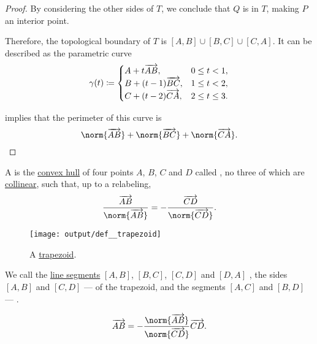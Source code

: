 \begin{proof}
  By considering the other sides of \( T \), we conclude that \( Q \) is in \( T \), making \( P \) an interior point.

  Therefore, the topological boundary of \( T \) is \( [A, B] \cup [B, C] \cup [C, A] \). It can be described as the parametric curve
  \begin{equation*}
    \gamma(t) \coloneqq \begin{cases}
      A + t \overrightarrow{AB},       &0 \leq t < 1, \\
      B + (t - 1) \overrightarrow{BC}, &1 \leq t < 2, \\
      C + (t - 2) \overrightarrow{CA}, &2 \leq t \leq 3.
    \end{cases}
  \end{equation*}

   implies that the perimeter of this curve is
  \begin{equation*}
    \norm{\vect{AB}} + \norm{\vect{BC}} + \norm{\vect{CA}}.
  \end{equation*}
\end{proof}

\begin{definition}\label{def:trapezoid}\mimprovised
  A  is the \hyperref[def:convex_hull]{convex hull} of four points \( A \), \( B \), \( C \) and \( D \) called , no three of which are \hyperref[def:collinear_points]{collinear}, such that, up to a relabeling,
  \begin{equation*}
    \frac {\vect{AB}} {\norm{\vect{AB}}} = -\frac {\vect{CD}} {\norm{\vect{CD}}}.
  \end{equation*}

  \begin{figure}[!ht]
    \centering
    \texttt{[image: output/def\_\_trapezoid]}
    \caption{A \hyperref[def:trapezoid]{trapezoid}.}\label{fig:def:trapezoid}
  \end{figure}

  We call the \hyperref[def:line_segment]{line segments} \( [A, B] \), \( [B, C] \), \( [C, D] \) and \( [D, A] \) , the sides \( [A, B] \) and \( [C, D] \) ---  of the trapezoid, and the segments \( [A, C] \) and \( [B, D] \) --- .

  \begin{equation*}
    \vect{AB} = -\frac {\norm{\vect{AB}}} {\norm{\vect{CD}}} \vect{CD}.
  \end{equation*}
\end{definition}

